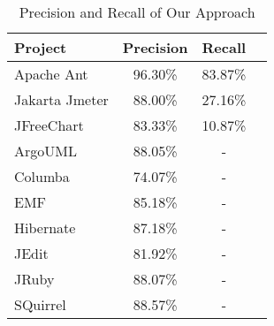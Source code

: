 
\begin{table}[!hbt]
	\begin{center}
		\caption{Precision and Recall of Our Approach}
		\label{tab:precision_and_recall}
		\begin{tabular}{l| c c c }
			\toprule
			\textbf{Project} & \textbf{Precision} & \textbf{Recall}\\ 
			\midrule
			Apache Ant        & 96.30\%  &    83.87\%      \\
			Jakarta Jmeter   & 88.00\%  &    27.16\%      \\
			JFreeChart         & 83.33\%  &    10.87\%      \\
			ArgoUML            & 88.05\%  &       -   \\
			Columba             & 74.07\%  &       -   \\
			EMF                    & 85.18\%  &       -   \\
			Hibernate            & 87.18\%  &       -   \\
			JEdit                    & 81.92\%  &       -   \\
			JRuby                  & 88.07\%  &       -   \\
			SQuirrel               & 88.57\%  &       -   \\
			\bottomrule
		\end{tabular}
	\end{center}
\end{table}

